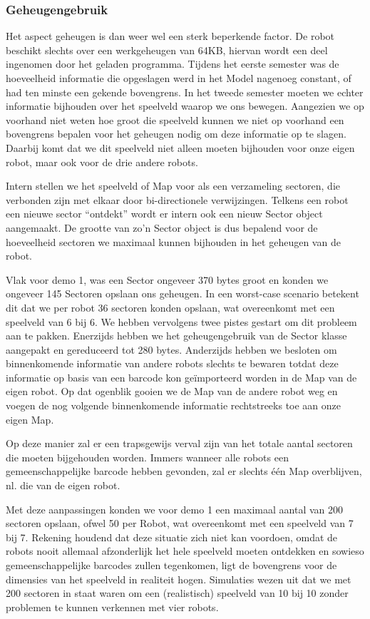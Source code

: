 \documentclass[12pt,a4paper]{report}
\begin{document}
\subsubsection{Geheugengebruik}

Het aspect geheugen is dan weer wel een sterk beperkende factor. De robot beschikt slechts over een werkgeheugen van 64KB, hiervan wordt een deel ingenomen door het geladen programma. Tijdens het eerste semester was de hoeveelheid informatie die opgeslagen werd in het Model nagenoeg constant, of had ten minste een gekende bovengrens. In het tweede semester moeten we echter informatie bijhouden over het speelveld waarop we ons bewegen. Aangezien we op voorhand niet weten hoe groot die speelveld kunnen we niet op voorhand een bovengrens bepalen voor het geheugen nodig om deze informatie op te slagen. Daarbij komt dat we dit speelveld niet alleen moeten bijhouden voor onze eigen robot, maar ook voor de drie andere robots.

Intern stellen we het speelveld of Map voor als een verzameling sectoren, die verbonden zijn met elkaar door bi-directionele verwijzingen. Telkens een robot een nieuwe sector ``ontdekt'' wordt er intern ook een nieuw Sector object aangemaakt. De grootte van zo'n Sector object is dus bepalend voor de hoeveelheid sectoren we maximaal kunnen bijhouden in het geheugen van de robot.

Vlak voor demo 1, was een Sector ongeveer 370 bytes groot en konden we ongeveer 145 Sectoren opslaan ons geheugen. In een worst-case scenario betekent dit dat we per robot 36 sectoren konden opslaan, wat overeenkomt met een speelveld van 6 bij 6. We hebben vervolgens twee pistes gestart om dit probleem aan te pakken. Enerzijds hebben we het geheugengebruik van de Sector klasse aangepakt en gereduceerd tot 280 bytes. Anderzijds hebben we besloten om binnenkomende informatie van andere robots slechts te bewaren totdat deze informatie op basis van een barcode kon ge\"importeerd worden in de Map van de eigen robot. Op dat ogenblik gooien we de Map van de andere robot weg en voegen de nog volgende binnenkomende informatie rechtstreeks toe aan onze eigen Map.

Op deze manier zal er een trapsgewijs verval zijn van het totale aantal sectoren die moeten bijgehouden worden. Immers wanneer alle robots een gemeenschappelijke barcode hebben gevonden, zal er slechts \'e\'en Map overblijven, nl. die van de eigen robot.

Met deze aanpassingen konden we voor demo 1 een maximaal aantal van 200 sectoren opslaan, ofwel 50 per Robot, wat overeenkomt met een speelveld van 7 bij 7. Rekening houdend dat deze situatie zich niet kan voordoen, omdat de robots nooit allemaal afzonderlijk het hele speelveld moeten ontdekken en sowieso gemeenschappelijke barcodes zullen tegenkomen, ligt de bovengrens voor de dimensies van het speelveld in realiteit hogen. Simulaties wezen uit dat we met 200 sectoren in staat waren om een (realistisch) speelveld van 10 bij 10 zonder problemen te kunnen verkennen met vier robots.
\end{document}
